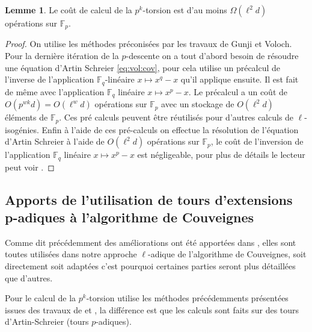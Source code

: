\documentclass[10pt,a4paper]{book}
\theoremstyle{plain}
\theoremstyle{definition}
\newtheorem{lem}[thm]{Lemme}
\theoremstyle{definition}
\theoremstyle{definition}
\theoremstyle{definition}
\theoremstyle{remark}
\theoremstyle{remark}
\theoremstyle{definition}
\begin{document}
\begin{lem}
Le coût de calcul de la $p^k$-torsion est d'au moins $\Omega(\ell^2d)$ opérations sur $\mathbb{F}_p$.
\end{lem}

\begin{proof}
On utilise les méthodes préconisées par les travaux de Gunji et Voloch. Pour la dernière itération de la $p$-descente on a tout d'abord besoin de résoudre une équation d'Artin Schreier \eqref{eq:vol:cov}, pour cela \cite{Couveignes96} utilise un précalcul de l'inverse de l'application $\mathbb{F}_q$-linéaire  $x \mapsto x^q-x$ qu'il applique ensuite. Il est fait de même avec l'application $\mathbb{F}_q$ linéaire $x \mapsto x^p - x$. Le précalcul a un coût de $O(p^{wk}d)=O(\ell^{w}d)$ opérations sur $\mathbb{F}_p$ avec un stockage de $O(\ell^2d)$ éléments de $\mathbb{F}_p$.
Ces pré calculs peuvent être réutilisés pour d'autres calculs de $\ell$-isogénies.
Enfin à l'aide de ces pré-calculs on effectue la résolution de l'équation d'Artin Schreier à l'aide de $O(\ell^2 d)$ opérations sur $\mathbb{F}_p$, le coût de l'inversion de l'application $\mathbb{F}_q$ linéaire $x \mapsto x^p - x$ est négligeable, pour plus de détails le lecteur peut voir \cite[§2.4]{Couveignes96}.
\end{proof}

\subsection{Apports de l'utilisation de tours d'extensions p-adiques à l'algorithme de Couveignes}

Comme dit précédemment des améliorations ont été apportées dans \cite{DeFeo11}, elles sont toutes utilisées dans notre approche $\ell$-adique de l'algorithme de Couveignes, soit directement soit adaptées c'est pourquoi certaines parties seront plus détaillées que d'autres.



Pour le calcul de la $p^k$-torsion \cite{DeFeo11} utilise les méthodes précédemments présentées issues des travaux de \cite{Gunji76} et \cite{Voloch90}, la différence est que les calculs sont faits sur des tours d'Artin-Schreier (tours $p$-adiques).
\end{document}
